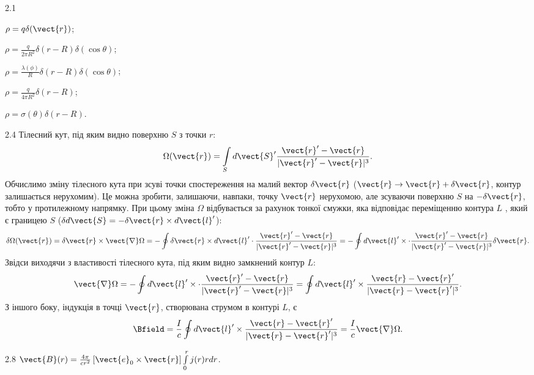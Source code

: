 \protect \section *{}
\begin{Solution}{2.{1}}
	\begin{enumerate*}[label=\alph*)]
		\item $\rho = q\delta(\vect{r})$;
		\item $\rho = \frac{q}{2\pi R^2}\delta(r - R)\delta(\cos\theta)$;
		\item $\rho = \frac{\lambda(\phi)}{R}\delta(r - R)\delta(\cos\theta)$;
		\item $\rho = \frac{q}{4\pi R^2}\delta (r - R)$;
		\item $\rho = \sigma (\theta)\delta (r - R)$.
	\end{enumerate*}
\end{Solution}
\begin{Solution}{2.{4}}
    Тілесний кут, під яким видно поверхню $S$ з точки $r$:
    \[
        \Omega(\vect{r}) = \int\limits_S d\vect{S}'\frac{\vect{r}' - \vect{r}}{|\vect{r}' - \vect{r}|^3}.
    \]
    Обчислимо зміну тілесного кута при зсуві точки спостереження на малий вектор $\delta\vect{r}$   ($\vect{r} \to \vect{r} + \delta\vect{r}$, контур залишається нерухомим). Це можна зробити, залишаючи, навпаки, точку $\vect{r}$  нерухомою, але зсуваючи поверхню $S$  на $-\delta\vect{r}$, тобто у протилежному напрямку. При цьому зміна $\Omega$ відбувається за рахунок тонкої смужки, яка відповідає переміщенню контура $L$ , який є границею $S$ ($\delta d{\vect{S}} =  - \delta\vect{r} \times d{\vect{l}'}$):
    \[
        \delta\Omega(\vect{r}) = \delta\vect{r}\times \vect{\nabla}\Omega = -\oint \delta\vect{r}\times d\vect{l}' \cdot \frac{\vect{r}' - \vect{r}}{|\vect{r}' - \vect{r}|^3} = - \oint  d\vect{l}' \times \cdot \frac{\vect{r}' - \vect{r}}{|\vect{r}' - \vect{r}|^3} \delta\vect{r}.
    \]
    Звідси виходячи з властивості тілесного кута, під яким видно замкнений контур $L$:
	\[
		\vect{\nabla}\Omega = - \oint  d\vect{l}' \times \cdot \frac{\vect{r}' - \vect{r}}{|\vect{r}' - \vect{r}|^3} = \oint  d\vect{l}' \times  \frac{\vect{r} - \vect{r}'}{|\vect{r} - \vect{r}'|^3}.
	\]
    З іншого боку, індукція в точці $\vect{r}$, створювана струмом в контурі $L$, є
	\[
		\Bfield = \frac{I}{c} \oint  d\vect{l}' \times  \frac{\vect{r} - \vect{r}'}{|\vect{r} - \vect{r}'|^3} = \frac{I}{c} \vect{\nabla}\Omega.
	\]
\end{Solution}
\begin{Solution}{2.{8}}
	$\vect{B}(r) = \frac{4\pi}{cr^2}\left[ \vect{e}_0 \times \vect{r} \right]\int\limits_0^r j(r)r dr$.
\end{Solution}
